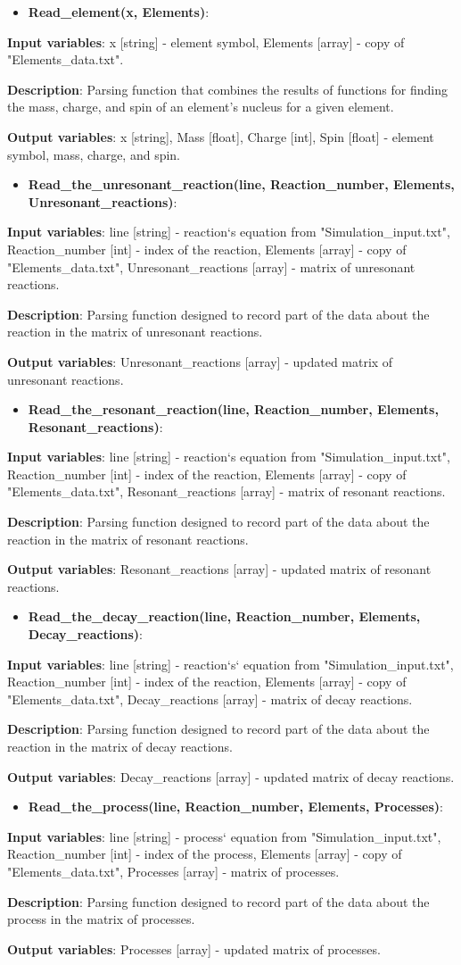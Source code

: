 \documentclass[a4paper,12pt]{article}
\newcommand{\namefunction}[4]{
  \begin{itemize}
    \item \textbf{#1}:
  \end{itemize}
  
  \textbf{Input variables}: #2.
  
  \textbf{Description}: #3.
  
  \textbf{Output variables}: #4.
}
\begin{document}
\vspace{1em}

\namefunction{Read\_element(x, Elements)}{x [string] - element symbol, Elements [array] - copy of "Elements\_data.txt"}{Parsing function that combines the results of functions for finding the mass, charge, and spin of an element's nucleus for a given element}{x [string], Mass [float], Charge [int], Spin [float] - element symbol, mass, charge, and spin}

\vspace{1em}

\namefunction{Read\_the\_unresonant\_reaction(line, Reaction\_number, Elements, Unresonant\_reactions)}{line [string] - reaction`s equation from "Simulation\_input.txt", Reaction\_number [int] - index of the reaction, Elements [array] - copy of "Elements\_data.txt", Unresonant\_reactions [array] - matrix of unresonant reactions}{Parsing function designed to record part of the data about the reaction in the matrix of unresonant reactions}{Unresonant\_reactions [array] - updated matrix of unresonant reactions}

\vspace{1em}

\namefunction{Read\_the\_resonant\_reaction(line, Reaction\_number, Elements, Resonant\_reactions)}{line [string] - reaction`s equation from "Simulation\_input.txt", Reaction\_number [int] - index of the reaction, Elements [array] - copy of "Elements\_data.txt", Resonant\_reactions [array] - matrix of resonant reactions}{Parsing function designed to record part of the data about the reaction in the matrix of resonant reactions}{Resonant\_reactions [array] - updated matrix of resonant reactions}

\vspace{1em}

\namefunction{Read\_the\_decay\_reaction(line, Reaction\_number, Elements, Decay\_reactions)}{line [string] - reaction`s` equation from "Simulation\_input.txt", Reaction\_number [int] - index of the reaction, Elements [array] - copy of "Elements\_data.txt", Decay\_reactions [array] - matrix of decay reactions}{Parsing function designed to record part of the data about the reaction in the matrix of decay reactions}{Decay\_reactions [array] - updated matrix of decay reactions}

\vspace{1em}

\namefunction{Read\_the\_process(line, Reaction\_number, Elements, Processes)}{line [string] - process` equation from "Simulation\_input.txt", Reaction\_number [int] - index of the process, Elements [array] - copy of "Elements\_data.txt", Processes [array] - matrix of processes}{Parsing function designed to record part of the data about the process in the matrix of processes}{Processes [array] - updated matrix of processes}
\end{document}
